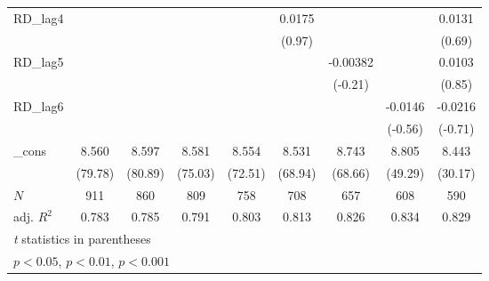 {\begin{tabular}{l*{8}{c}}
RD\_lag4     &                     &                     &                     &                     &      0.0175         &                     &                     &      0.0131         \\
            &                     &                     &                     &                     &      (0.97)         &                     &                     &      (0.69)         \\
\addlinespace
RD\_lag5     &                     &                     &                     &                     &                     &    -0.00382         &                     &      0.0103         \\
            &                     &                     &                     &                     &                     &     (-0.21)         &                     &      (0.85)         \\
\addlinespace
RD\_lag6     &                     &                     &                     &                     &                     &                     &     -0.0146         &     -0.0216         \\
            &                     &                     &                     &                     &                     &                     &     (-0.56)         &     (-0.71)         \\
\addlinespace
\_cons      &       8.560\sym{***}&       8.597\sym{***}&       8.581\sym{***}&       8.554\sym{***}&       8.531\sym{***}&       8.743\sym{***}&       8.805\sym{***}&       8.443\sym{***}\\
            &     (79.78)         &     (80.89)         &     (75.03)         &     (72.51)         &     (68.94)         &     (68.66)         &     (49.29)         &     (30.17)         \\
\midrule
\(N\)       &         911         &         860         &         809         &         758         &         708         &         657         &         608         &         590         \\
adj. \(R^{2}\)&       0.783         &       0.785         &       0.791         &       0.803         &       0.813         &       0.826         &       0.834         &       0.829         \\
\bottomrule
\multicolumn{9}{l}{\footnotesize \textit{t} statistics in parentheses}\\
\multicolumn{9}{l}{\footnotesize \sym{*} \(p<0.05\), \sym{**} \(p<0.01\), \sym{***} \(p<0.001\)}\\
\end{tabular}
}
